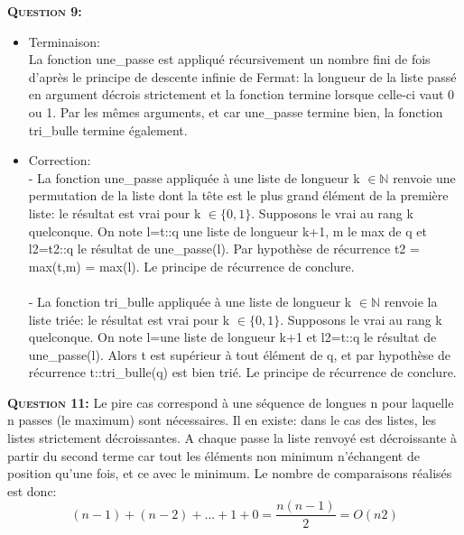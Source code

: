\documentclass{article}
\begin{document}
\textsc{\bfseries Question 9:}
\begin{itemize}
	\item Terminaison:\\
		La fonction une\_passe est appliqué récursivement un nombre fini de fois d'après le principe de descente infinie de Fermat: la longueur de la liste passé en argument décrois strictement et la fonction termine lorsque celle-ci vaut 0 ou 1.
		Par les mêmes arguments, et car une\_passe termine bien, la fonction tri\_bulle termine également. 
	\item Correction:\\
		- La fonction une\_passe appliquée à une liste de longueur k \(\in \mathbb{N}\) renvoie une permutation de la liste dont la tête est le plus grand élément de la première liste: le résultat est vrai pour k \(\in\{0,1\}\). Supposons le vrai au rang k quelconque. On note l=t::q une liste de longueur k+1, m le max de q et l2=t2::q le résultat de une\_passe(l). Par hypothèse de récurrence t2 = max(t,m) = max(l). Le principe de récurrence de conclure.\\\\
		- La fonction tri\_bulle appliquée à une liste  de longueur k \(\in \mathbb{N}\) renvoie la liste triée: le résultat est vrai pour k \(\in\{0,1\}\). Supposons le vrai au rang k quelconque. On note l=une liste de longueur k+1 et l2=t::q le résultat de une\_passe(l). Alors t est supérieur à tout élément de q, et par hypothèse de récurrence t::tri\_bulle(q) est bien trié. Le principe de récurrence de conclure.\\

\end{itemize}

\textsc{\bfseries Question 11:}
Le pire cas correspond à une séquence de longues n pour laquelle n passes (le maximum) sont nécessaires. Il en existe: dans le cas des listes, les listes strictement décroissantes. A chaque passe la liste renvoyé est décroissante à partir du second terme car tout les éléments non minimum n'échangent de position qu'une fois, et ce avec le minimum. Le nombre de comparaisons réalisés est donc: 
	\[(n-1)+(n-2)+...+1+0=\frac{n(n-1)}{2}=O(n{2})\]
\end{document}
